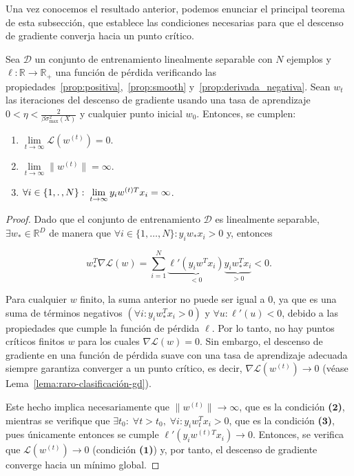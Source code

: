 Una vez conocemos el resultado anterior, podemos enunciar el principal teorema de esta subsección, que establece las condiciones necesarias para que el descenso de gradiente converja hacia un punto crítico.

\begin{teorema}\label{teorema:clasificación-gd}
    Sea $\mathcal{D}$ un conjunto de entrenamiento linealmente separable con $N$ ejemplos y $\ell: \mathbb{R} \to \mathbb{R}_{+}$ una función de pérdida verificando las propiedades~\ref{prop:positiva},~\ref{prop:smooth} y~\ref{prop:derivada_negativa}. Sean $w_t$ las iteraciones del descenso de gradiente usando una tasa de aprendizaje $0 < \eta < \frac{2}{\beta \sigma^{2}_{\max}(X)}$ y cualquier punto inicial $w_0$. Entonces, se cumplen:

    \begin{enumerate}
        \item $\lim \limits_{t \to \infty} \mathcal{L}(w^{(t)}) = 0$.
        \item $\lim \limits_{t \to \infty} \| w^{(t)} \| = \infty$.
        \item $\forall i \in \{ 1, \ldotp, N\}: \; \lim \limits_{t \to \infty} y_i {w}^{(t)T} x_i = \infty$.
    \end{enumerate}
\end{teorema}

\begin{proof}
    Dado que el conjunto de entrenamiento $\mathcal{D}$ es linealmente separable, $\exists w_{*} \in \mathbb{R}^{D}$ de manera que $\forall i \in \{1, \ldots, N \} : y_i w_{*} x_i > 0$ y, entonces

    \[
        w_{*}^{T}\nabla\mathcal{L}(w) = \sum_{i=1}^{N} \underbrace{\ell'(y_i w^{T} x_i)}_{< 0} \underbrace{y_i w_{*}^{T}x_i}_{> 0} < 0.
    \]

    Para cualquier $w$ finito, la suma anterior no puede ser igual a $0$, ya que es una suma de términos negativos $(\forall i: y_i w_{*}^{T}x_i > 0)$ y $\forall u: \ell'(u) < 0$, debido a las propiedades que cumple la función de pérdida $\ell$. Por lo tanto, no hay puntos críticos finitos $w$ para los cuales $\nabla \mathcal{L}(w) = 0$. Sin embargo, el descenso de gradiente en una función de pérdida suave con una tasa de aprendizaje adecuada siempre garantiza converger a un punto crítico, es decir, $\nabla \mathcal{L}(w^{(t)}) \to 0$ (véase Lema~\ref{lema:raro-clasificación-gd}).
    
    Este hecho implica necesariamente que $\| w^{(t)} \| \to \infty$, que es la condición \textbf{($\boldsymbol{2}$)}, mientras se verifique que $\exists t_0 : \; \forall t > t_0, \; \forall i: y_i w_{t}^{T} x_i > 0$, que es la condición \textbf{($\boldsymbol{3}$)}, pues únicamente entonces se cumple $\ell'(y_i {w}^{(t)T} x_i) \to 0$. Entonces, se verifica que $\mathcal{L}(w^{(t)}) \to 0$ (condición \textbf{($\boldsymbol{1}$)}) y, por tanto, el descenso de gradiente converge hacia un mínimo global.
\end{proof}

